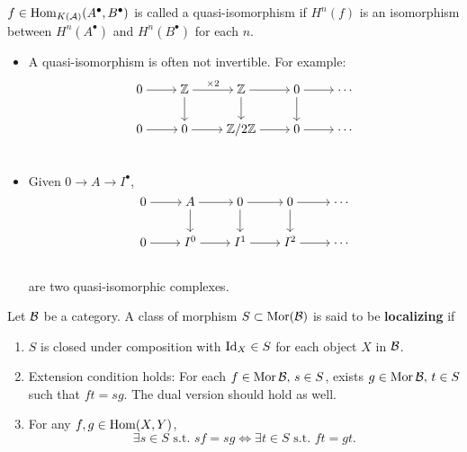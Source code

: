 \begin{definition}
  $f \in \operatorname{Hom}_{K(\mathcal{A})}(A^\bullet, B^\bullet)$ is called a quasi-isomorphism
  if $H^n(f)$ is an isomorphism between $H^n(A^\bullet)$ and $H^n(B^\bullet)$
  for each $n$.
\end{definition}

\begin{example}
  \begin{itemize}
    \item A quasi-isomorphism is often not invertible. For example:
    \[ \begin{tikzcd}[cramped]
        0 \ar[r] & \Zb \ar[r, "\times 2"] \ar[d] & \Zb \ar[r] \ar[d] & 0 \ar[r] \ar[d] & \cdots \\
        0 \ar[r] & 0 \ar[r] & \Zb / 2\Zb \ar[r] & 0 \ar[r] & \cdots \\
    \end{tikzcd} \]
    \item Given $0 \to A \to I^\bullet$,
      \[ \begin{tikzcd}[cramped]
          0 \ar[r] & A \ar[r] \ar[d] & 0 \ar[r] \ar[d] & 0 \ar[r] \ar[d] & \cdots \\
          0 \ar[r] & I^0 \ar[r] & I^1 \ar[r] & I^2 \ar[r] & \cdots \\
      \end{tikzcd} \]
    are two quasi-isomorphic complexes.
  \end{itemize}
\end{example}

\begin{definition}
  Let $\mathcal{B}$ be a category. A class of morphism $S \subset \operatorname{Mor}(\mathcal{B})$
  is said to be {\bf localizing} if
  \begin{enumerate}
    \item $S$ is closed under composition with ${\rm Id}_X \in S$ for each object $X$
      in $\mathcal{B}$.
    \item Extension condition holds: For each $f \in \operatorname{Mor} \mathcal{B}, \, s \in S$,
      exists $g \in \operatorname{Mor} \mathcal{B}, \, t \in S$ such that $ft = sg$.
      The dual version should hold as well.
    \item For any $f, g \in \operatorname{Hom}(X, Y)$,
      \[ \exists s \in S \text{ s.t. } sf = sg \iff \exists t \in S \text{ s.t. } ft = gt. \]
  \end{enumerate}
\end{definition}

